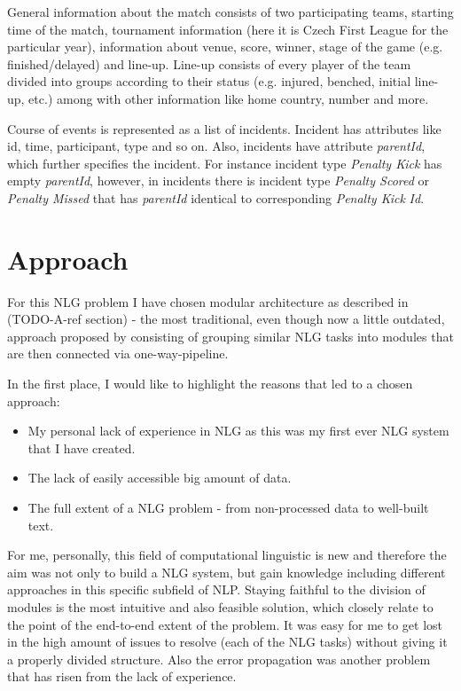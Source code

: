 General information about the match consists of two participating teams, starting time of the match, tournament information (here it is Czech First League for the particular year), information about venue, score, winner, stage of the game (e.g. finished/delayed) and line-up. Line-up consists of every player of the team divided into groups according to their status (e.g. injured, benched, initial line-up, etc.) among with other information like home country, number and more. 

Course of events is represented as a list of incidents. Incident has attributes like id, time, participant, type and so on. Also, incidents have attribute \emph{parentId}, which further specifies the incident. For instance incident type \emph{Penalty Kick} has empty \emph{parentId}, however, in incidents there is incident type \emph{Penalty Scored} or \emph{Penalty Missed} that has \emph{parentId} identical to corresponding \emph{Penalty Kick} \emph{Id}. 

\section{Approach}

For this NLG problem I have chosen modular architecture as described in (TODO-A-ref section) - the most traditional, even though now a little outdated, approach proposed by \cite {reiter1997building} consisting of grouping similar NLG tasks into modules that are then connected via one-way-pipeline. 

In the first place, I would like to highlight the reasons that led to a chosen approach:
\begin{itemize}
	\item My personal lack of experience in NLG as this was my first ever NLG system that I have created.
	\item The lack of easily accessible big amount of data.
	\item The full extent of a NLG problem - from non-processed data to well-built text.   
\end{itemize}

For me, personally, this field of computational linguistic is new and therefore the aim  was not only to build a NLG system, but gain knowledge including different approaches in this specific subfield of NLP. Staying faithful to the division of modules is the most intuitive and also feasible solution, which closely relate to the point of the end-to-end extent of the problem. It was easy for me to get lost in the high amount of issues to resolve (each of the NLG tasks) without giving it a properly divided structure. Also the error propagation was another problem that has risen from the lack of experience.

